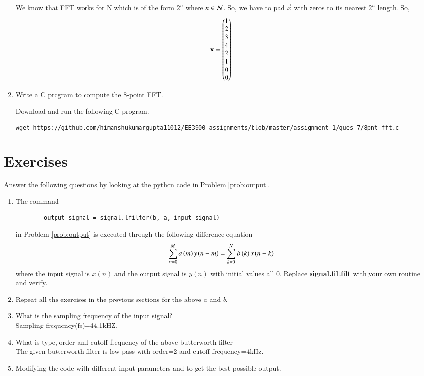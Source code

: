 \documentclass[journal,12pt,twocolumn]{IEEEtran}
\renewcommand\thesection{\arabic{section}}
\begin{document}
\begin{enumerate}[label=\arabic*.,ref=\thesection.\theenumi]
	\solution  We know that FFT works for N  which is of the form $2^n$ where $n\in \cal N$.
	So, we have to pad $\vec{x}$ with zeros to its nearest $2^n$ length.
	So,
	\begin{align}
		\mathbf{x}=\begin{pmatrix}1\\2\\3\\4\\2\\1\\0\\0\end{pmatrix}
	\end{align}
	\item Write a C program to compute the 8-point FFT. 
	
	\solution Download and run the following C program.
	\begin{lstlisting}
wget https://github.com/himanshukumargupta11012/EE3900_assignments/blob/master/assignment_1/ques_7/8pnt_fft.c
	\end{lstlisting}
\end{enumerate}
\section{Exercises}
Answer the following questions by looking at the python code in Problem \ref{prob:output}.
\begin{enumerate}[label=\thesection.\arabic*]
	\item
	The command
	\begin{lstlisting}
		output_signal = signal.lfilter(b, a, input_signal)
	\end{lstlisting}
	in Problem \ref{prob:output} is executed through the following difference equation
	\begin{equation}
		\label{eq:iir_filter_gen}
		\sum _{m=0}^{M}a\left(m\right)y\left(n-m\right)=\sum _{k=0}^{N}b\left(k\right)x\left(n-k\right)
	\end{equation}
	where the input signal is $x(n)$ and the output signal is $y(n)$ with initial values all 0. Replace
	\textbf{signal.filtfilt} with your own routine and verify.
	\item Repeat all the exercises in the previous sections for the above $a$ and $b$.
	\item What is the sampling frequency of the input signal?
	\\
	\solution
	Sampling frequency(fs)=44.1kHZ.
	\item
	What is type, order and  cutoff-frequency of the above butterworth filter
	\\
	\solution
	The given butterworth filter is low pass with order=2 and cutoff-frequency=4kHz.
	\item
	Modifying the code with different input parameters and to get the best possible output.
\end{enumerate}
\end{document}

